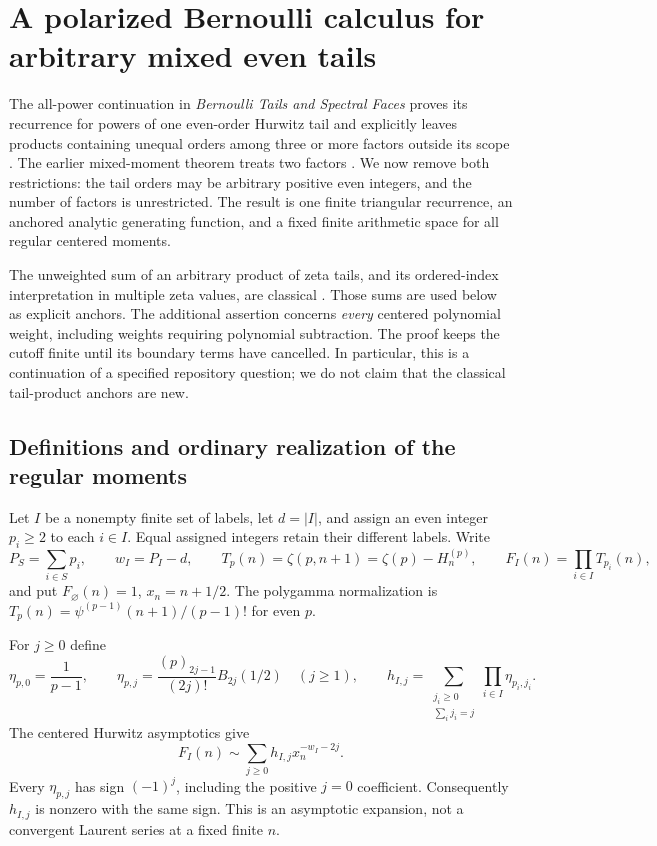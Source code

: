 \section{A polarized Bernoulli calculus for arbitrary mixed even tails}
\label{mtp:section}

The all-power continuation in \emph{Bernoulli Tails and Spectral Faces}
proves its recurrence for powers of one even-order Hurwitz tail and
explicitly leaves products containing unequal orders among three or
more factors outside its scope \cite[Section 2, after the even-order
extension]{RepoBernoulli}. The earlier mixed-moment theorem treats
two factors \cite[Section 4]{RepoMixed}. We now remove both
restrictions: the tail orders may be arbitrary positive even integers,
and the number of factors is unrestricted. The result is one finite
triangular recurrence, an anchored analytic generating function, and a
fixed finite arithmetic space for all regular centered moments.

The unweighted sum of an arbitrary product of zeta tails, and its
ordered-index interpretation in multiple zeta values, are classical
\cite{Hoffman}. Those sums are used below as explicit anchors.
The additional assertion concerns \emph{every} centered polynomial
weight, including weights requiring polynomial subtraction. The proof
keeps the cutoff finite until its boundary terms have cancelled.
In particular, this is a continuation of a specified repository question;
we do not claim that the classical tail-product anchors are new.

\subsection{Definitions and ordinary realization of the regular moments}

Let $I$ be a nonempty finite set of labels, let $d=|I|$, and assign an
even integer $p_i\ge2$ to each $i\in I$. Equal assigned integers retain
their different labels. Write
\[
 P_S=\sum_{i\in S}p_i,\qquad w_I=P_I-d,\qquad
 T_p(n)=\zeta(p,n+1)=\zeta(p)-H_n^{(p)},
 \qquad F_I(n)=\prod_{i\in I}T_{p_i}(n),
\]
and put $F_\varnothing(n)=1$, $x_n=n+1/2$. The polygamma normalization is
$T_p(n)=\psi^{(p-1)}(n+1)/(p-1)!$ for even $p$.

For $j\ge0$ define
\begin{equation}\label{mtp:eta}
 \eta_{p,0}=\frac1{p-1},\qquad
 \eta_{p,j}=\frac{(p)_{2j-1}}{(2j)!}B_{2j}(1/2)\quad(j\ge1),
 \qquad
 h_{I,j}=\sum_{\substack{j_i\ge0\\\sum_i j_i=j}}
                        \prod_{i\in I}\eta_{p_i,j_i}.
\end{equation}
The centered Hurwitz asymptotics \cite[Section 25.11]{DLMF} give
\begin{equation}\label{mtp:asymptotic}
                F_I(n)\sim\sum_{j\ge0}h_{I,j}x_n^{-w_I-2j}.
\end{equation}
Every $\eta_{p,j}$ has sign $(-1)^j$, including the positive $j=0$
coefficient. Consequently $h_{I,j}$ is nonzero with the same sign.
This is an asymptotic expansion, not a convergent Laurent series at a
fixed finite $n$.

